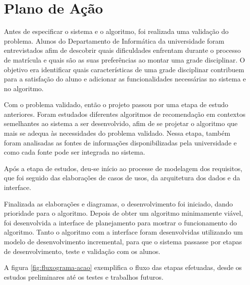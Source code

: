 
\chapter{Plano de Ação}
\label{cha:Plano de Ação}

Antes de especificar o sistema e o algoritmo, foi realizada uma validação do problema. Alunos do Departamento de Informática da universidade foram entrevistados afim de descobrir quais dificuldades enfrentam durante o processo de matrícula e quais são as suas preferências ao montar uma grade disciplinar. O objetivo era identificar quais características de uma grade disciplinar contribuem para a satisfação do aluno e adicionar as funcionalidades necessárias no sistema e no algoritmo.

Com o problema validado, então o projeto passou por uma etapa de estudo anteriores. 
Foram estudados diferentes algoritmos de recomendação em contextos semelhantes ao sistema a ser desenvolvido, afim de se projetar o algoritmo que mais se adequa às necessidades do problema validado. 
Nessa etapa, também foram analisadas as fontes de informações disponibilizadas pela universidade e como cada fonte pode ser integrada no sistema. 

Após a etapa de estudos, deu-se início ao processe de modelagem dos requisitos, que foi seguido das elaborações de casos de usos, da arquitetura dos dados e da interface. 

Finalizada as elaborações e diagramas, o desenvolvimento foi iniciado, dando prioridade para o algoritmo. Depois de obter um algoritmo minimamente viável, foi desenvolvida a interface de planejamento para mostrar o funcionamento do algoritmo. 
Tanto o algoritmo com a interface foram desenvolvidas utilizando um modelo de desenvolvimento incremental, para que o sistema passasse por etapas de desenvolvimento, teste e validação com os alunos. 

A figura \ref{fig:fluxograma-acao} exemplifica o fluxo das etapas efetuadas, desde os estudos preliminares até os testes e trabalhos futuros.

